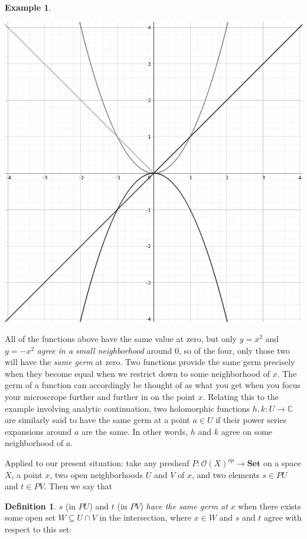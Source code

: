 \documentclass[11pt]{book}
\theoremstyle{definition}
\newtheorem{example}{Example}[section]
\theoremstyle{definition}
\newtheorem{definition}{Definition}[section]
\theoremstyle{definition}
\theoremstyle{theorem}
\theoremstyle{definition}
\begin{document}
\begin{example}
\begin{center}
		\includegraphics[scale=0.17]{GermsPic.png}
	\end{center} 
	All of the functions above have the same value at zero, but only $y = x^2$ and $y = -x^2$ \textit{agree in a small neighborhood} around 0, so of the four, only those two will have the \textit{same germ} at zero. Two functions provide the same germ precisely when they become equal when we restrict down to some neighborhood of $x$. The germ of a function can accordingly be thought of as what you get when you focus your microscrope further and further in on the point $x$. Relating this to the example involving analytic continuation, two holomorphic functions $h, k: U \rightarrow \mathbb{C}$ are similarly said to have the same germ at a point $a \in U$ if their power series expansions around $a$ are the same. In other words, $h$ and $k$ agree on some neighborhood of $a$. \par 
	Applied to our present situation: take any presheaf $P: \mathscr{O}(X)^{op} \rightarrow \textbf{Set}$ on a space $X$, a point $x$, two open neighborhoods $U$ and $V$ of $x$, and two elements $s \in PU$ and $t \in PV$. Then we say that 
	\begin{definition} 
	$s$ (in $PU$) and $t$ (in $PV$) \textit{have the same germ at} $x$ when there exists some open set $W \subseteq U \cap V$ in the intersection, where $x \in W$ and $s$ and $t$ agree with respect to this set: 

\end{definition}
\end{example}
\end{document}
